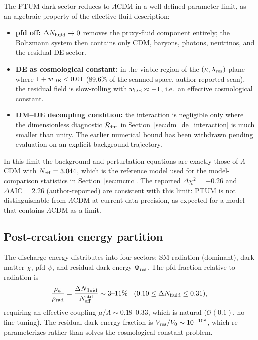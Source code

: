 \documentclass[epj]{svjour}
\begin{document}
The PTUM dark sector reduces to \(\Lambda\)CDM in a well-defined
parameter limit, as an algebraic property of the effective-fluid
description:
\begin{itemize}
\item \textbf{pfd off:} \(\Delta N_{\rm fluid}\to0\) removes the proxy-fluid
component entirely; the Boltzmann system then contains only CDM,
baryons, photons, neutrinos, and the residual DE sector.
\item \textbf{DE as cosmological constant:} in the viable region of
the \((\kappa,\lambda_{\rm res})\) plane where \(1+w_{\rm DE}<0.01\)
(89.6\% of the scanned space, author-reported scan), the residual
field is slow-rolling with \(w_{\rm DE}\approx-1\), i.e.\ an effective
cosmological constant.
\item \textbf{DM--DE decoupling condition:} the interaction is
negligible only where the dimensionless diagnostic
\(\mathcal{R}_{\rm int}\) in Section~\ref{sec:dm_de_interaction}
is much smaller than unity. The earlier numerical bound has been
withdrawn pending evaluation on an explicit background trajectory.
\end{itemize}
In this limit the background and perturbation equations are exactly
those of \(\Lambda\)CDM with \(N_{\rm eff}=3.044\), which is the
reference model used for the model-comparison statistics in
Section~\ref{sec:mcmc}. The reported \(\Delta\chi^2=+0.26\) and
\(\Delta\mathrm{AIC}=2.26\) (author-reported) are consistent with this
limit: PTUM is not distinguishable from \(\Lambda\)CDM at current
data precision, as expected for a model that contains \(\Lambda\)CDM
as a limit.

\subsection{Post-creation energy partition}

The discharge energy distributes into four sectors: SM radiation
(dominant), dark matter \(\chi\), pfd \(\psi\), and residual dark
energy \(\Phi_{\rm res}\). The pfd fraction relative to radiation is
\begin{equation}
\frac{\rho_\psi}{\rho_{\rm rad}}
=\frac{\Delta N_{\rm fluid}}{N_{\rm eff}^{\rm std}}
\sim3\text{--}11\%
\quad(0.10\le\Delta N_{\rm fluid}\le0.31),
\end{equation}
requiring an effective coupling \(\mu/\Lambda\sim0.18\text{--}0.33\),
which is natural (\(\mathcal{O}(0.1)\), no fine-tuning). The
residual dark-energy fraction is
\(V_{\rm res}/V_0\sim10^{-108}\), which re-parameterizes rather
than solves the cosmological constant problem.
\end{document}
